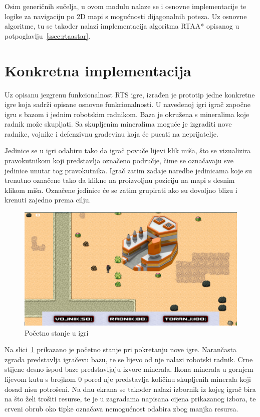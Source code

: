 \documentclass[times, utf8, zavrsni, numeric]{fer}
\begin{document}
\par Osim generičnih sučelja, u ovom modulu nalaze se i osnovne implementacije te logike za navigaciju po 2D mapi s mogućnosti dijagonalnih poteza.
Uz osnovne algoritme, tu se također nalazi implementacija algoritma RTAA* opisanog u potpoglavlju~\ref{ssec:rtaastar}.

\section{Konkretna implementacija}

\par Uz opisanu jezgrenu funkcionalnost RTS igre, izrađen je prototip jedne konkretne igre koja sadrži opisane osnovne funkcionalnosti.
U navedenoj igri igrač započne igru s bazom i jednim robotskim radnikom.
Baza je okružena s mineralima koje radnik može skupljati.
Sa skupljenim mineralima moguće je izgraditi nove radnike, vojnike i defenzivnu građevinu koja će pucati na neprijatelje.

\par Jedinice se u igri odabiru tako da igrač povuče lijevi klik miša, što se vizualizira pravokutnikom koji predstavlja označeno područje, čime se označavaju sve jedinice unutar tog pravokutnika.
Igrač zatim zadaje naredbe jedinicama koje su trenutno označene tako da klikne na proizvoljnu poziciju na mapi s desnim klikom miša.
Označene jedinice će se zatim grupirati ako su dovoljno blizu i krenuti zajedno prema cilju.

\begin{figure}[h]
	\centering
	\includegraphics[width=0.9\linewidth]{images/gameStart.png}
	\caption{Početno stanje u igri}
	\label{fig:gameStart}
\end{figure}

\par Na slici~\ref{fig:gameStart} prikazano je početno stanje pri pokretanju nove igre.
Narančasta zgrada predstavlja igračevu bazu, te se lijevo od nje nalazi robotski radnik.
Crne stijene desno ispod baze predstavljaju izvore minerala.
Ikona minerala u gornjem lijevom kutu s brojkom 0 pored nje predstavlja količinu skupljenih minerala koji dosad nisu potrošeni.
Na dnu ekrana se također nalazi izbornik iz kojeg igrač bira na što želi trošiti resurse, te je u zagradama napisana cijena prikazanog izbora, te crveni obrub oko tipke označava nemogućnost odabira zbog manjka resursa.
\end{document}
